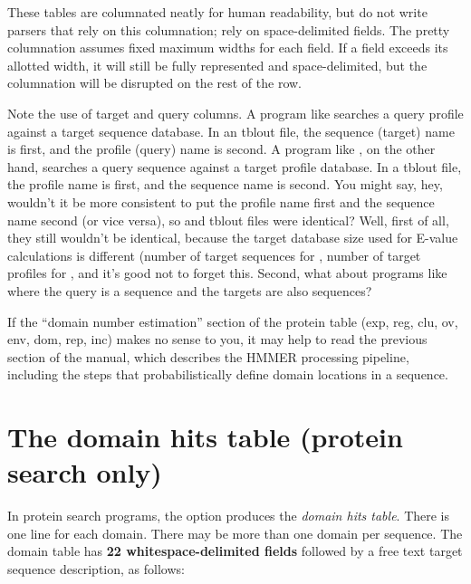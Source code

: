 These tables are columnated neatly for human readability, but do not
write parsers that rely on this columnation; rely on space-delimited
fields. The pretty columnation assumes fixed maximum widths for each
field. If a field exceeds its allotted width, it will still be fully
represented and space-delimited, but the columnation will be disrupted
on the rest of the row.

Note the use of target and query columns. A program like
 searches a query profile against a target sequence
database. In an  tblout file, the sequence (target)
name is first, and the profile (query) name is second. A program like
, on the other hand, searches a query sequence against a
target profile database. In a  tblout file, the profile
name is first, and the sequence name is second. You might say, hey,
wouldn't it be more consistent to put the profile name first and the
sequence name second (or vice versa), so  and
 tblout files were identical? Well, first of all, they
still wouldn't be identical, because the target database size used for
E-value calculations is different (number of target sequences for
, number of target profiles for , and
  it's good not to forget this. Second, what about programs like
   where the query is a sequence and the targets are also
  sequences?

If the ``domain number estimation'' section of the protein table (exp, reg,
clu, ov, env, dom, rep, inc) makes no sense to you, it may help to
read the previous section of the manual, which describes the HMMER
processing pipeline, including the steps that probabilistically define
domain locations in a sequence.

\section{The domain hits table (protein search only)}

In protein search programs, the  option produces the
\emph{domain hits table}. There is one line for each domain. There may be more than
one domain per sequence. The domain table has \textbf{22
  whitespace-delimited fields} followed by a free text target sequence
description, as follows:


